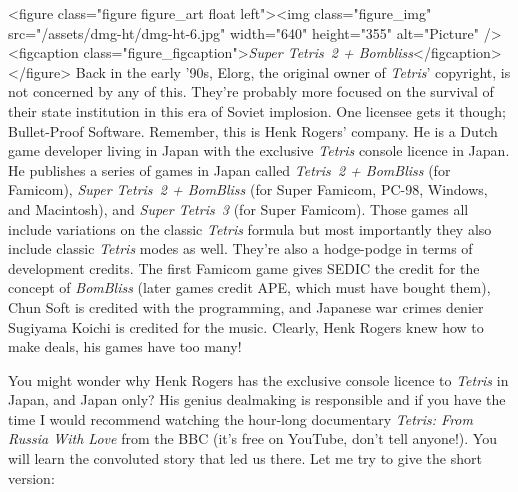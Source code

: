 \documentclass{book}
\begin{document}
<figure class="figure figure_art float left"><img class="figure_img" src="/assets/dmg-ht/dmg-ht-6.jpg" width="640" height="355" alt="Picture" /><figcaption class="figure_figcaption">\emph{Super Tetris~2 + Bombliss}</figcaption></figure>
Back in the early ’90s, Elorg, the original owner of \emph{Tetris}’ copyright, is not concerned by any of this. They’re probably more focused on the survival of their state institution in this era of Soviet implosion. One licensee gets it though; Bullet-Proof Software. Remember, this is Henk Rogers’ company. He is a Dutch game developer living in Japan with the exclusive \emph{Tetris} console licence in Japan. He publishes a series of games in Japan called \emph{Tetris~2 + BomBliss} (for Famicom), \emph{Super Tetris~2 + BomBliss} (for Super Famicom, PC-98, Windows, and Macintosh), and \emph{Super Tetris~3} (for Super Famicom). Those games all include variations on the classic \emph{Tetris} formula but most importantly they also include classic \emph{Tetris} modes as well. They’re also a hodge-podge in terms of development credits. The first Famicom game gives SEDIC the credit for the concept of \emph{BomBliss} (later games credit APE, which must have bought them), Chun Soft is credited with the programming, and Japanese war crimes denier Sugiyama Koichi is credited for the music. Clearly, Henk Rogers knew how to make deals, his games have too many!

You might wonder why Henk Rogers has the exclusive console licence to \emph{Tetris} in Japan, and Japan only? His genius dealmaking is responsible and if you have the time I would recommend watching the hour-long documentary \emph{Tetris: From Russia With Love} from the BBC (it’s free on YouTube, don’t tell anyone!). You will learn the convoluted story that led us there. Let me try to give the short version:
\end{document}
